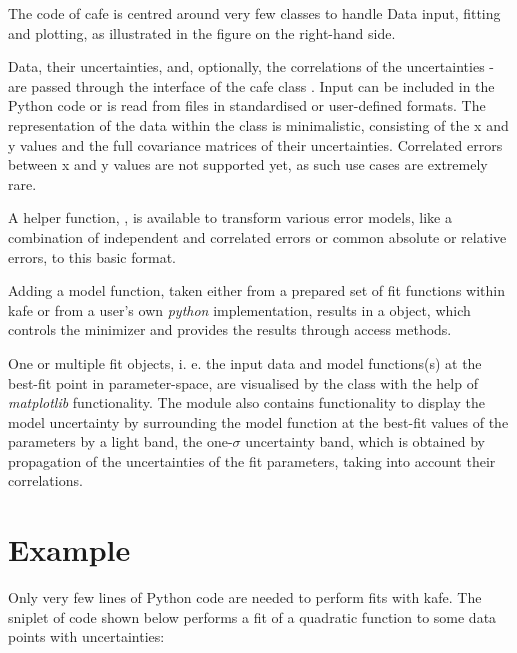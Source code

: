 \documentclass[a4paper,10pt,english]{sphinxmanual}
\begin{document}
The code of cafe is centred around very few classes to handle Data input,
fitting and plotting, as illustrated in the figure on the right-hand side.

Data, their uncertainties, and, optionally, the correlations of the
uncertainties - are passed through the interface of the cafe class
. Input can be included in the Python code or is read
from files in standardised or user-defined formats. The representation
of the data within the  class is minimalistic, consisting
of the x and y values and the full covariance matrices of their
uncertainties. Correlated errors between x and y values are not
supported yet, as such use cases are extremely rare.

A helper function, , is available
to transform various error models, like a combination of independent
and correlated errors or common absolute or relative errors, to this
basic format.

Adding a model function, taken either from a prepared set of fit
functions within kafe or from a user's own \emph{python} implementation,
results in a  object, which controls the minimizer 
and provides the results through access methods.

One or multiple fit objects, i. e. the input data and model
functions(s) at the best-fit point in parameter-space, are
visualised by the class  with the help of \emph{matplotlib}
functionality. The  module also contains functionality to
display the model uncertainty by surrounding the model function
at the best-fit values of the parameters by a light band, the one-\(\sigma\)
uncertainty band, which is obtained by propagation of the uncertainties
of the fit parameters, taking into account their correlations.


\section{Example}
\label{index:example}
Only very few lines of Python code are needed to perform fits with kafe.
The sniplet of code shown below performs a fit of a quadratic
function to some data points with uncertainties:
\end{document}
